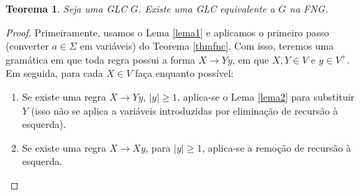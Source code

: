 \documentclass[a4paper]{article}
\newtheorem{Theorem}{Teorema}
\theoremstyle{definition}
\begin{document}
  \begin{Theorem}\label{thmfng}
    Seja uma GLC $G$. Existe uma GLC equivalente a $G$ na FNG.
  \end{Theorem}
  \begin{proof}
    Primeiramente, usamos o Lema \ref{lema1} e aplicamos o primeiro passo
    (converter $a\in \Sigma$ em variáveis) do Teorema \ref{thmfnc}. Com isso,
    teremos uma gramática em que toda regra possui a forma $X \to Yy$, em que
    $X,Y \in V$ e $y \in V^+$. Em seguida, para cada $X \in
    V$ faça enquanto possível:
    \begin{enumerate}
       \item Se existe uma regra $X \to Yy$, $|y| \geq 1$,
          aplica-se o Lema \ref{lema2} para substituir 
        $Y$ (isso não se aplica a variáveis introduzidas por eliminação de
        recursão à esquerda).
      \item Se existe uma regra $X \to Xy$, para $|y| \geq 1$, aplica-se 
        a remoção de recursão à esquerda. 
    \end{enumerate}
  \end{proof}
\end{document}
